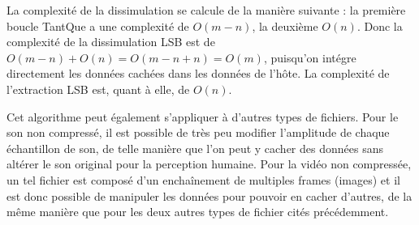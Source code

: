\documentclass[11pt]{article}
\begin{document}






La complexité de la dissimulation se calcule de la manière suivante : 
la première boucle TantQue a une complexité de $O(m-n)$, la deuxième $O(n)$. 
\newline Donc la complexité de la dissimulation LSB est de $O(m-n)+O(n)=O(m-n+n)=O(m)$, 
puisqu'on intégre directement les données cachées dans les données de l'hôte. 
\newline La complexité de l'extraction LSB est, quant à elle, de $O(n)$.

Cet algorithme peut également s'appliquer à d'autres types de fichiers. Pour le
son non compressé, il est possible de très peu modifier l'amplitude de chaque
échantillon de son, de telle manière que l'on peut y cacher des données sans
altérer le son original pour la perception humaine. Pour la vidéo non compressée,
un tel fichier est composé d'un enchaînement de multiples frames (images) et il
est donc possible de manipuler les données pour pouvoir en cacher d'autres, de
la même manière que pour les deux autres types de fichier cités précédemment.
\end{document}
